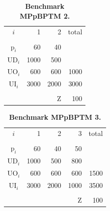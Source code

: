 \documentclass[10pt,fleqn,a4paper,twoside]{article}
\begin{document}
\begin{table}[h!]
\begin{center}
\caption{\textbf{Benchmark MPpBPTM 2.}}
\begin{tabular}[c]{c r r r}
\\
$i$ & 1 & 2 & total \\
\cline {1-4} \\
$\textrm{p}_i$ & 60 & 40 & \\
$\textrm{UD}_i$ & 1000 & 500 & \\
$\textrm{UO}_i$ & 600 & 600 & 1000 \\
$\textrm{UI}_i$ & 3000 & 2000 & 3000 \\
\cline {1-4} \\
& & $\textrm{Z}$ & 100 \\
\end{tabular}
\label{tab:MBPTMP001}
\end{center}
\end{table}

\begin{table}[h!]
\begin{center}
\caption{\textbf{Benchmark MPpBPTM 3.}}
\begin{tabular}[c]{c r r r r}
\\
$i$ & 1 & 2 & 3 & total \\
\cline {1-5} \\
$\textrm{p}_i$ & 60 & 40 & 50 \\
$\textrm{UD}_i$ & 1000 & 500 & 800 \\
$\textrm{UO}_i$ & 600 & 600 & 600 & 1500 \\
$\textrm{UI}_i$ & 3000 & 2000 & 1000 & 3500 \\
\cline {1-5} \\
& & & $\textrm{Z}$ & 100 \\
\end{tabular}
\label{tab:MBPTMP002}
\end{center}
\end{table}
\end{document}
